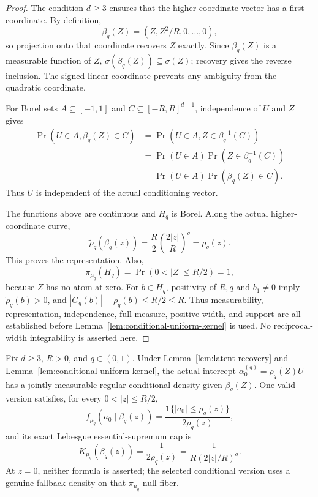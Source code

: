 \begin{proof}
The condition $d\geq3$ ensures that the higher-coordinate vector has a
first coordinate.  By definition,
\[
\beta_q(Z)=(Z,Z^2/R,0,\ldots,0),
\]
so projection onto that coordinate recovers $Z$ exactly.  Since
$\beta_q(Z)$ is a measurable function of $Z$,
$\sigma(\beta_q(Z))\subseteq\sigma(Z)$; recovery gives the reverse
inclusion.  The signed linear coordinate prevents any ambiguity from the
quadratic coordinate.

For Borel sets $A\subseteq[-1,1]$ and
$C\subseteq[-R,R]^{d-1}$, independence of $U$ and $Z$ gives
\[
\begin{aligned}
\Pr(U\in A,\beta_q(Z)\in C)
&=\Pr(U\in A,Z\in\beta_q^{-1}(C))\\
&=\Pr(U\in A)\Pr(Z\in\beta_q^{-1}(C))\\
&=\Pr(U\in A)\Pr(\beta_q(Z)\in C).
\end{aligned}
\]
Thus $U$ is independent of the actual conditioning vector.

The functions above are continuous and $H_q$ is Borel.  Along the
actual higher-coordinate curve,
\[
\widetilde\rho_q(\beta_q(z))
=\frac R2\left(\frac{2|z|}{R}\right)^q
=\rho_q(z).
\]
This proves the representation.  Also,
\[
\pi_{\mu_q}(H_q)=\Pr(0<|Z|\leq R/2)=1,
\]
because $Z$ has no atom at zero.  For $b\in H_q$, positivity of $R,q$ and
$b_1\neq0$ imply $\widetilde\rho_q(b)>0$, and
$|G_q(b)|+\widetilde\rho_q(b)\leq R/2\leq R$.  Thus measurability,
representation, independence, full measure, positive width, and support
are all established before Lemma~\ref{lem:conditional-uniform-kernel} is
used.  No reciprocal-width integrability is asserted here.
\end{proof}

\begin{proposition}
\label{prop:witness-conditional-cap}
Fix $d\geq3$, $R>0$, and $q\in(0,1)$.  Under
Lemma~\ref{lem:latent-recovery} and
Lemma~\ref{lem:conditional-uniform-kernel}, the actual intercept
$\alpha_0^{(q)}=\rho_q(Z)U$ has a jointly measurable regular conditional
density given $\beta_q(Z)$.  One valid version satisfies, for every
$0<|z|\leq R/2$,
\[
f_{\mu_q}(a_0\mid\beta_q(z))
=\frac{\mathbf1\{|a_0|\leq\rho_q(z)\}}{2\rho_q(z)},
\]
and its exact Lebesgue essential-supremum cap is
\[
K_{\mu_q}(\beta_q(z))
=\frac{1}{2\rho_q(z)}
=\frac{1}{R(2|z|/R)^q}.
\]
At $z=0$, neither formula is asserted; the selected conditional version
uses a genuine fallback density on that $\pi_{\mu_q}$-null fiber.
\end{proposition}


